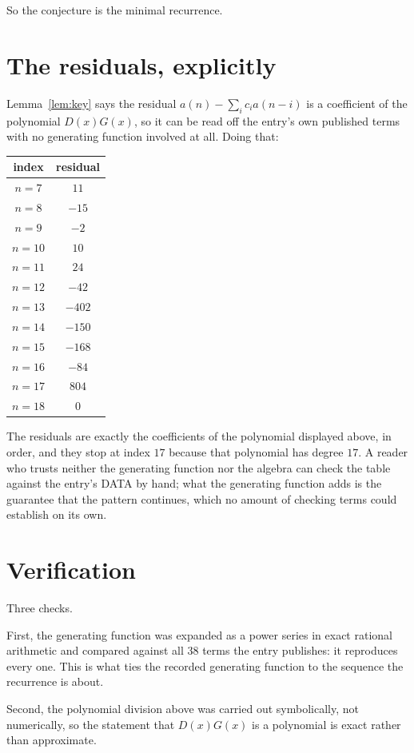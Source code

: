 \documentclass[11pt,a4paper]{article}
\theoremstyle{plain}
\theoremstyle{definition}
\begin{document}
So the conjecture is the minimal recurrence.

\section{The residuals, explicitly}

Lemma~\ref{lem:key} says the residual $a(n)-\sum_ic_ia(n-i)$ is a coefficient of the
polynomial $D(x)G(x)$, so it can be read off the entry's own published terms with no
generating function involved at all. Doing that:
\begin{center}
\begin{tabular}{cc}
index & residual \\ \hline
$n=7$ & $11$ \\
$n=8$ & $-15$ \\
$n=9$ & $-2$ \\
$n=10$ & $10$ \\
$n=11$ & $24$ \\
$n=12$ & $-42$ \\
$n=13$ & $-402$ \\
$n=14$ & $-150$ \\
$n=15$ & $-168$ \\
$n=16$ & $-84$ \\
$n=17$ & $804$ \\
$n=18$ & $0$
\end{tabular}
\end{center}
The residuals are exactly the coefficients of the polynomial displayed above, in order, and
they stop at index $17$ because that polynomial has degree $17$. A reader who trusts
neither the generating function nor the algebra can check the table against the entry's DATA
by hand; what the generating function adds is the guarantee that the pattern continues, which
no amount of checking terms could establish on its own.

\section{Verification}

Three checks.

First, the generating function was expanded as a power series in exact rational arithmetic and
compared against all $38$ terms the entry publishes: it reproduces every one. This is
what ties the recorded generating function to the sequence the recurrence is about.

Second, the polynomial division above was carried out symbolically, not numerically, so the
statement that $D(x)G(x)$ is a polynomial is exact rather than approximate.
\end{document}
